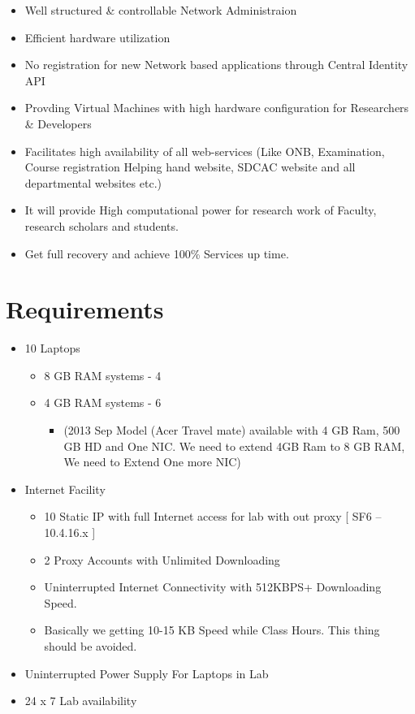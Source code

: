 \documentclass[]{article}
\begin{document}
\begin{itemize}
	\item Well structured \& controllable Network Administraion
	\item Efficient hardware utilization
	\item No registration for new Network based applications through Central Identity API
	\item Provding Virtual Machines with high hardware configuration for Researchers \& Developers
	\item Facilitates high availability of all web-services (Like ONB, Examination, Course registration Helping hand website, SDCAC website and all departmental websites etc.)
	\item It will provide High computational power for research work of Faculty, research scholars and students.
	\item Get full recovery and  achieve 100\% Services up time.
\end{itemize}


\section*{Requirements}
\begin{center}
\begin{itemize}
\item  10 Laptops %
\begin{itemize}
	\item  8 GB RAM systems - 4 
	\item  4 GB RAM systems - 6 
	\begin{itemize}
		\item (2013 Sep Model (Acer Travel mate) available with 4 GB Ram, 500 GB HD and One NIC. We need to extend 4GB Ram to 8 GB RAM, We need to Extend One more NIC)
	\end{itemize}
	
\end{itemize}
 
\item Internet Facility 
\begin{itemize}
	\item 10 Static IP with full Internet access for lab with out proxy [ SF6 – 10.4.16.x ]
	\item 2 Proxy Accounts with Unlimited Downloading 
	\item Uninterrupted Internet Connectivity with 512KBPS+ Downloading Speed.
	\item Basically we getting 10-15 KB Speed while Class Hours. This thing should be avoided.
\end{itemize}

\item Uninterrupted Power Supply For Laptops in Lab
\item 24 x 7 Lab availability
\end{itemize}
\end{center}
\end{document}
